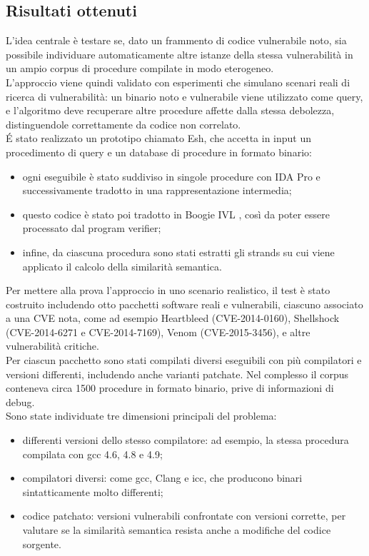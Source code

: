 \documentclass[12pt,a4paper,openright,twoside]{report}
\begin{document}
\subsection{Risultati ottenuti}

L’idea centrale è testare se, dato un frammento di codice vulnerabile noto, sia possibile individuare automaticamente altre istanze della stessa vulnerabilità in un ampio corpus di procedure compilate in modo eterogeneo.  \\
L’approccio viene quindi validato con esperimenti che simulano scenari reali di ricerca di vulnerabilità: un binario noto e vulnerabile viene utilizzato come query, e l’algoritmo deve recuperare altre procedure affette dalla stessa debolezza, distinguendole correttamente da codice non correlato.\\
É stato realizzato un prototipo chiamato Esh, che accetta in input un procedimento di query e un database di procedure in formato binario: 
\begin{itemize}
    \item ogni eseguibile è stato suddiviso in singole procedure con IDA Pro \cite{idapro} e successivamente tradotto in una rappresentazione intermedia;  
    \item questo codice è stato poi tradotto in Boogie IVL \cite{boogie}, così da poter essere processato dal program verifier;
    \item infine, da ciascuna procedura sono stati estratti gli strands su cui viene applicato il calcolo della similarità semantica.  
\end{itemize}
Per mettere alla prova l’approccio in uno scenario realistico, il test è stato costruito includendo otto pacchetti software reali e vulnerabili, ciascuno associato a una CVE nota, come ad esempio Heartbleed (CVE-2014-0160), Shellshock (CVE-2014-6271 e CVE-2014-7169), Venom (CVE-2015-3456), e altre vulnerabilità critiche.\\
Per ciascun pacchetto sono stati compilati diversi eseguibili con più compilatori e versioni differenti, includendo anche varianti patchate. Nel complesso il corpus conteneva circa 1500 procedure in formato binario, prive di informazioni di debug.\\
Sono state individuate tre dimensioni principali del problema:
\begin{itemize}
    \item differenti versioni dello stesso compilatore: ad esempio, la stessa procedura compilata con gcc 4.6, 4.8 e 4.9; 
    \item compilatori diversi: come gcc, Clang e icc, che producono binari sintatticamente molto differenti; 
    \item codice patchato: versioni vulnerabili confrontate con versioni corrette, per valutare se la similarità semantica resista anche a modifiche del codice sorgente.  
\end{itemize}
\end{document}
